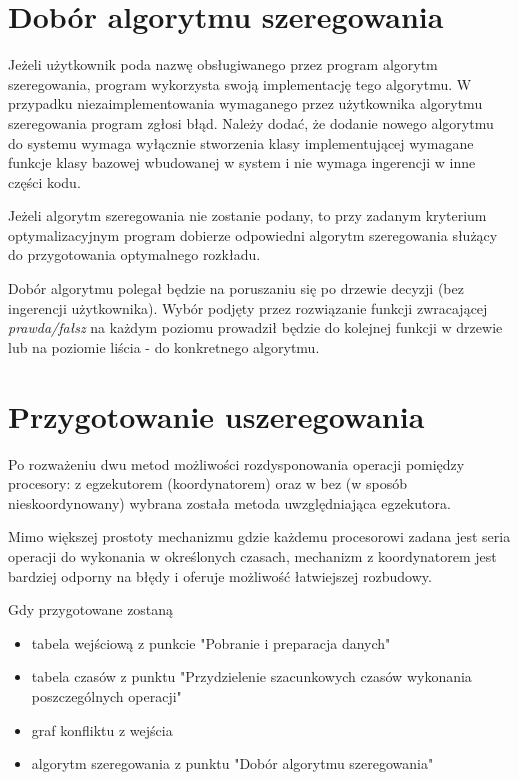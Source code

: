 \documentclass[brudnopis]{xmgr}
\begin{document}
\section{Dobór algorytmu szeregowania}

Jeżeli użytkownik poda nazwę obsługiwanego przez program algorytm szeregowania, program wykorzysta swoją implementację tego algorytmu.
W przypadku niezaimplementowania wymaganego przez użytkownika algorytmu szeregowania program zgłosi błąd.
Należy dodać, że dodanie nowego algorytmu do systemu wymaga wyłącznie stworzenia klasy implementującej wymagane funkcje klasy bazowej wbudowanej w system i nie wymaga ingerencji w inne części kodu.
\medskip

Jeżeli algorytm szeregowania nie zostanie podany, to przy zadanym kryterium optymalizacyjnym program dobierze odpowiedni algorytm szeregowania służący do przygotowania optymalnego rozkładu.
\medskip

Dobór algorytmu polegał będzie na poruszaniu się po drzewie decyzji (bez ingerencji użytkownika).
Wybór podjęty przez rozwiązanie funkcji zwracającej \emph{prawda/fałsz} na każdym poziomu prowadził będzie do kolejnej funkcji w drzewie lub na poziomie liścia - do konkretnego algorytmu.

\section{Przygotowanie uszeregowania}

Po rozważeniu dwu metod możliwości rozdysponowania operacji pomiędzy procesory: z egzekutorem (koordynatorem) oraz w bez (w sposób nieskoordynowany) wybrana została metoda uwzględniająca egzekutora.
\medskip

Mimo większej prostoty mechanizmu gdzie każdemu procesorowi zadana jest seria operacji do wykonania w określonych czasach, mechanizm z koordynatorem jest bardziej odporny na błędy i oferuje możliwość łatwiejszej rozbudowy.

Gdy przygotowane zostaną

\begin{itemize}
    \item tabela wejściową z punkcie "Pobranie i preparacja danych"
    \item tabela czasów z punktu "Przydzielenie szacunkowych czasów wykonania poszczególnych operacji"
    \item graf konfliktu z wejścia
    \item algorytm szeregowania z punktu "Dobór algorytmu szeregowania"
\end{itemize}
\end{document}
